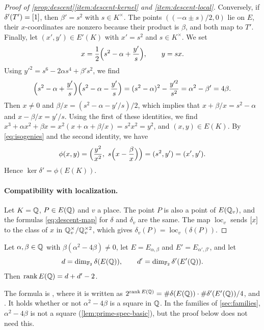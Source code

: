 \begin{proof}[Proof of \cref{prop:descent}\ref{item:descent-kernel} and \ref{item:descent-local}]
Conversely, if $\delta'(T')=[1]$, then $\beta'=s^2$ with $s\in K^\times$. The points $((-\alpha\pm s)/2,0)$ lie on $E$, their $x$-coordinates are nonzero because their product is $\beta$, and both map to $T'$. Finally, let $(x',y')\in E'(K)$ with $x'=s^2$ and $s\in K^\times$. We set
\begin{equation}\label{eq:preimage-phi}
x=\frac12\Bigl(s^2-\alpha+\frac{y'}s\Bigr),\qquad y=sx.
\end{equation}
Using $y'^2=s^6-2\alpha s^4+\beta's^2$, we find
\begin{equation}\label{eq:preimage-phi-product}
\Bigl(s^2-\alpha+\frac{y'}s\Bigr)\Bigl(s^2-\alpha-\frac{y'}s\Bigr)=(s^2-\alpha)^2-\frac{y'^2}{s^2}=\alpha^2-\beta'=4\beta.
\end{equation}
Then $x\ne0$ and $\beta/x=(s^2-\alpha-y'/s)/2$, which implies that $x+\beta/x=s^2-\alpha$ and $x-\beta/x=y'/s$. Using the first of these identities, we find $x^3+\alpha x^2+\beta x=x^2(x+\alpha+\beta/x)=s^2x^2=y^2$, and $(x,y)\in E(K)$. By \eqref{eq:isogenies} and the second identity, we have
\begin{equation}
\phi(x,y)=\Bigl(\frac{y^2}{x^2},\ s\Bigl(x-\frac\beta x\Bigr)\Bigr)=(s^2,y')=(x',y').
\end{equation}
Hence $\ker\delta'=\phi(E(K))$.

\paragraph{Compatibility with localization.} Let $K=\mathbb Q$, $P\in E(\mathbb Q)$ and $v$ a place. The point $P$ is also a point of $E(\mathbb Q_v)$, and the formulas \eqref{eq:descent-map} for $\delta$ and $\delta_v$ are the same. The map $\operatorname{loc}_v$ sends $[x]$ to the class of $x$ in $\mathbb Q_v^{\times}/\mathbb Q_v^{\times2}$, which gives $\delta_v(P)=\operatorname{loc}_v(\delta(P))$.
\end{proof}

\begin{lemma}\label{lem:rank-formula}
Let $\alpha,\beta\in\mathbb Q$ with $\beta(\alpha^2-4\beta)\ne0$, let $E=E_{\alpha,\beta}$ and $E'=E_{\alpha',\beta'}$, and let
\begin{equation}\label{eq:d-dprime}
d=\dim_{\mathbb F_2}\delta(E(\mathbb Q)),\qquad d'=\dim_{\mathbb F_2}\delta'(E'(\mathbb Q)).
\end{equation}
Then $\operatorname{rank} E(\mathbb Q)=d+d'-2$.
\end{lemma}

The formula is \cite[Section~3.6]{SilvermanTate2015}, where it is written as $2^{\operatorname{rank} E(\mathbb Q)}=\#\delta(E(\mathbb Q))\cdot\#\delta'(E'(\mathbb Q))/4$, and \cite[Lemma~3.1]{Zywina2026}. It holds whether or not $\alpha^2-4\beta$ is a square in $\mathbb Q$. In the families of \cref{sec:families}, $\alpha^2-4\beta$ is not a square (\cref{lem:prime-spec-basic}), but the proof below does not need this.

